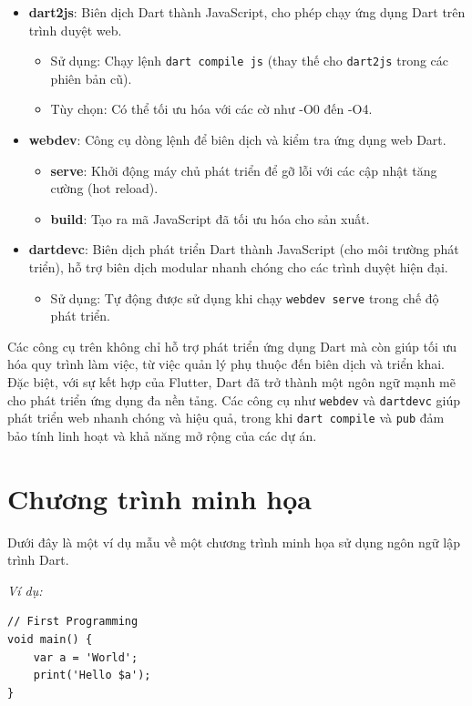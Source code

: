 \documentclass[../DoAn.tex]{subfiles}
\numberwithin{figure}{chapter}
\begin{document}
\begin{itemize}
    \item \textbf{dart2js}: Biên dịch Dart thành JavaScript, cho phép chạy ứng dụng Dart trên trình duyệt web.
    \begin{itemize}
        \item Sử dụng: Chạy lệnh \texttt{dart compile js} (thay thế cho \texttt{dart2js} trong các phiên bản cũ).
        \item Tùy chọn: Có thể tối ưu hóa với các cờ như -O0 đến -O4.
    \end{itemize}
    \item \textbf{webdev}: Công cụ dòng lệnh để biên dịch và kiểm tra ứng dụng web Dart.
    \begin{itemize}
        \item \textbf{serve}: Khởi động máy chủ phát triển để gỡ lỗi với các cập nhật tăng cường (hot reload).
        \item \textbf{build}: Tạo ra mã JavaScript đã tối ưu hóa cho sản xuất.
    \end{itemize}
    \item \textbf{dartdevc}: Biên dịch phát triển Dart thành JavaScript (cho môi trường phát triển), hỗ trợ biên dịch modular nhanh chóng cho các trình duyệt hiện đại.
    \begin{itemize}
        \item Sử dụng: Tự động được sử dụng khi chạy \texttt{webdev serve} trong chế độ phát triển.
    \end{itemize}
\end{itemize}

Các công cụ trên không chỉ hỗ trợ phát triển ứng dụng Dart mà còn giúp tối ưu hóa quy trình làm việc, từ việc quản lý phụ thuộc đến biên dịch và triển khai. Đặc biệt, với sự kết hợp của Flutter, Dart đã trở thành một ngôn ngữ mạnh mẽ cho phát triển ứng dụng đa nền tảng. Các công cụ như \texttt{webdev} và \texttt{dartdevc} giúp phát triển web nhanh chóng và hiệu quả, trong khi \texttt{dart compile} và \texttt{pub} đảm bảo tính linh hoạt và khả năng mở rộng của các dự án.

\section{Chương trình minh họa}
Dưới đây là một ví dụ mẫu về một chương trình minh họa sử dụng ngôn ngữ lập trình Dart.

\textit{Ví dụ:}
\begin{lstlisting}
// First Programming
void main() {
    var a = 'World';
    print('Hello $a');
} 
\end{lstlisting}
\end{document}
